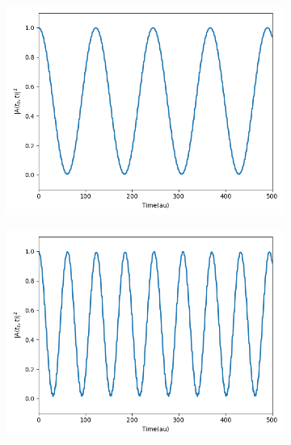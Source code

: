 \begin{figure}
     \centering
     \begin{subfigure}{0.47\textwidth}
         \centering
         \includegraphics[width=\textwidth]{ch4/Figs/7-1.png}
     \end{subfigure}
     \hfill
     \begin{subfigure}{0.47\textwidth}
         \centering
         \includegraphics[width=\textwidth]{ch4/Figs/7-3.png}
      \end{subfigure}
       \vfill
     \begin{subfigure}{0.47\textwidth}
         \centering

\end{subfigure}
\end{figure}
